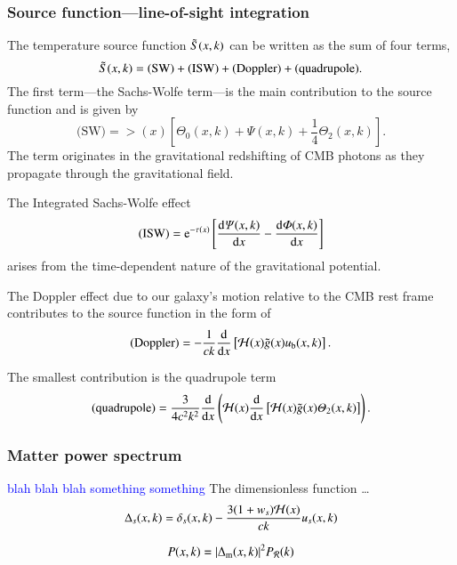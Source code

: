 \subsubsection{Source function---line-of-sight integration}
    The temperature source function $\tilde{S}(x,k)$ can be written as the sum of four terms,
    \begin{equation}\label{mil4:theo:eq:source_function_four_terms}
        \tilde{S}(x,k) = \text{(SW)} + \text{(ISW)} + \text{(Doppler)} + \text{(quadrupole)}.
    \end{equation}
    The first term---the Sachs-Wolfe term---is the main contribution to the source function and is given by
    \begin{equation}
        \text{(SW)} = \gt(x) \left[\Theta_0(x,k) + \Psi(x,k) + \frac{1}{4}\Theta_2(x,k) \right].
    \end{equation}
    The term originates in the gravitational redshifting of CMB photons as they propagate through the gravitational field.

    The Integrated Sachs-Wolfe effect %
    \begin{equation}
        \text{(ISW)} = \eu[-\tau(x)] \left[ \dv{\Psi(x,k)}{x}-  \dv{\Phi(x,k)}{x} \right]
    \end{equation}
    arises from the time-dependent nature of the gravitational potential.

    The Doppler effect due to our galaxy's motion relative to the CMB rest frame contributes to the source function in the form of
    \begin{equation}
        \text{(Doppler)} = - \frac{1}{ck} \dv{}{x} \left[\mathcal{H}(x) \tilde{g}(x) u_\mathrm{b}(x,k) \right].
    \end{equation}

    The smallest contribution is the quadrupole term 
    \begin{equation}
        \text{(quadrupole)} =  \frac{3}{4c^2k^2} \dv{}{x} \left(\mathcal{H}(x) \dv{}{x} \left[ \mathcal{H}(x) \tilde{g}(x) \varTheta_2(x,k) \right] \right).
    \end{equation}



\subsubsection{Matter power spectrum}
    \textcolor{blue}{blah blah blah something something}
    The dimensionless function \dots
    \begin{equation}\label{mil4:theo:eq:Delta_s_of_x_k}
        \Delta_s (x,k) = \delta_s(x,k) - \frac{3(1+w_s)\mathcal{H}(x)}{ck}u_s(x,k)
    \end{equation}

    \begin{equation}\label{mil4:theo:eq:matter_power_spectrum}
        P(x,k) = \abs{\Delta_\mathrm{m}(x,k)}^2 P_\mathcal{R}(k)
    \end{equation}


    